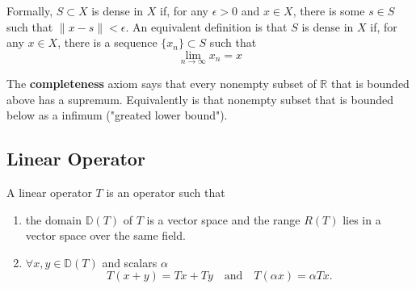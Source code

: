 \documentclass{article}
\theoremstyle{remark}
\begin{document}
\begin{definition}
  Formally, $S \subset X$ is dense in $X$ if, for any $\epsilon > 0$ and $x \in X$, there is some $s \in S$ such that $\|x-s\| < \epsilon$. An equivalent definition is that $S$ is dense in $X$ if, for any $x \in X$, there is a sequence $\{x_{n}\} \subset S$ such that \[
  \lim_{n \to \infty} x_{n} = x
  \] 
  
\end{definition}

\begin{definition}
  The \textbf{completeness}  axiom says that every nonempty subset of $\mathbb{R} $ that is bounded above has a supremum. Equivalently is that nonempty subset that is bounded below as a infimum ("greated lower bound").
\end{definition}


\subsection{Linear Operator}%
\label{sub:linear_operator}

\begin{definition}
  A linear operator $T$ is an operator such that 
  \begin{enumerate}
    \item the domain $\mathbb{D}\left( T \right) $ of $T$ is a vector space and the range $R\left( T \right) $ lies in a vector space over the same field. 
    \item  $\forall x,y \in \mathbb{D}\left( T \right) $ and scalars $\alpha$ 
      \begin{equation}
      \label{eq:linear-operator}
      T\left( x + y \right) = Tx + Ty \quad \text{and} \quad T\left( \alpha x \right) = \alpha Tx
      .\end{equation}
  \end{enumerate}

\end{definition}
\end{document}
